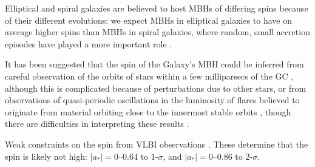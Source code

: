 {Elliptical and spiral galaxies are believed to host MBHs of differing spins because of their different evolutions: we expect MBHs in elliptical galaxies to have on average higher spins than MBHs in spiral galaxies, where random, small accretion episodes have played a more important role \citep{Volonteri2007, Sikora2007}.

It has been suggested that the spin of the Galaxy's MBH could be inferred from careful observation of the orbits of stars within a few milliparsecs of the GC \citep{Merritt2010}, although this is complicated because of perturbations due to other stars, or from observations of quasi-periodic oscillations in the luminosity of flares believed to originate from material orbiting close to the innermost stable orbits \citep{Genzel2003a, Belanger2006, Trippe2007, Hamaus2009, Kato2010}, though there are difficulties in interpreting these results \citep{Psaltis2008a}.


Weak constraints on the spin from VLBI observations \citep{Broderick2009a,Broderick2011}. These determine that the spin is likely not high: $|a_\ast| = 0$--$0.64$ to $1$-$\sigma$, and $|a_\ast| = 0$--$0.86$ to $2$-$\sigma$.

}
